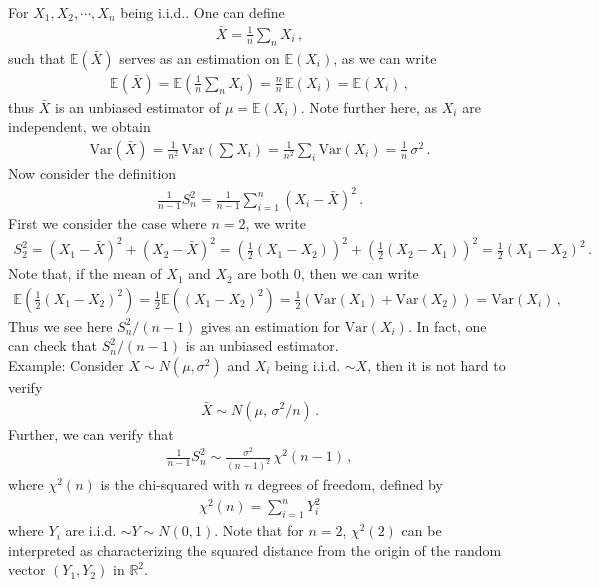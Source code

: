\documentclass[11pt, onesided]{book}
\theoremstyle{break}
\theoremstyle{break}
\newcommand{\R}{\mathbb{R}}
\newcommand{\example}{\color{green}Example: \color{black}}
\begin{document}
\newpage
For $X_1,X_2,\cdots, X_n$ being i.i.d.. One can define
\begin{align*}
\bar{X} = \frac{1}{n}\sum_n X_i\,,
\end{align*}
such that $\mathbb{E}(\bar{X})$ serves as an estimation on $\mathbb{E}(X_i)$, as we can write
\begin{align*}
\mathbb{E}(\bar{X}) = \mathbb{E}\left( \frac{1}{n}\sum_{n}X_i\right) = \frac{n}{n}\, \mathbb{E}(X_i) = \mathbb{E}(X_i)\,,
\end{align*}
thus $\bar{X}$ is an unbiased estimator of $\mu = \mathbb{E}(X_i)$. Note further here, as $X_i$
are independent, we obtain
\begin{align*}
\text{Var}(\bar{X}) = \frac{1}{n^2}\, \text{Var}\left( \sum X_i\right) = \frac{1}{n^2}\sum_i \text{Var}(X_i) = \frac{1}{n}\,\sigma^2 \,.
\end{align*}
Now consider the definition
\begin{align*}
\frac{1}{n-1}S_n^2 = \frac{1}{n-1}\sum_{i=1}^n (X_i - \bar{X})^2\,.
\end{align*}
First we consider the case where $n=2$, we write
\begin{align*}
S_2^2 = (X_1 - \bar{X})^2+ (X_2 - \bar{X})^2 = \left( \frac{1}{2}(X_1 - X_2)\right)^2 + \left( \frac{1}{2}(X_2 - X_1)\right)^2 = \frac{1}{2}\left( X_1 - X_2\right)^2\,.
\end{align*}
Note that, if the mean of $X_1$ and $X_2$ are both $0$, then we can write
\begin{align*}
\mathbb{E}\left(\frac{1}{2}(X_1 - X_2)^2  \right) = \frac{1}{2}\mathbb{E}((X_1 - X_2)^2) =\frac{1}{2}\left( \text{Var}(X_1) + \text{Var}(X_2)\right) = \text{Var}(X_i) \,,
\end{align*}
Thus we see here $S_n^2/(n-1)$ gives an estimation for $\text{Var}(X_i)$. In fact, one can check that $S_n^2/(n-1)$ is an unbiased estimator. \\

\example Consider $X \sim N(\mu, \sigma^2)$ and $X_i$ being i.i.d. $\sim	 X$, then it is not hard to verify
\begin{align*}
\bar{X}\sim N\left( \mu,\, \sigma^2/n\right)\,.
\end{align*}
Further, we can verify that 
\begin{align*}
\frac{1}{n-1} S^2_n \sim \frac{\sigma^2}{(n-1)^2}\, \chi^2(n-1)\,,
\end{align*}
where $\chi^2(n)$ is the chi-squared with $n$ degrees of freedom, defined by
\begin{align*}
\chi^2(n) = \sum_{i=1}^n Y_i^2
\end{align*}
where $Y_i$ are i.i.d. $\sim	Y \sim N(0,1)$. Note that for $n=2$, $\chi^2(2)$ can be interpreted as characterizing the squared distance from the origin of the random vector $(Y_1,Y_2)$ in $\R^2$. \\
\end{document}
